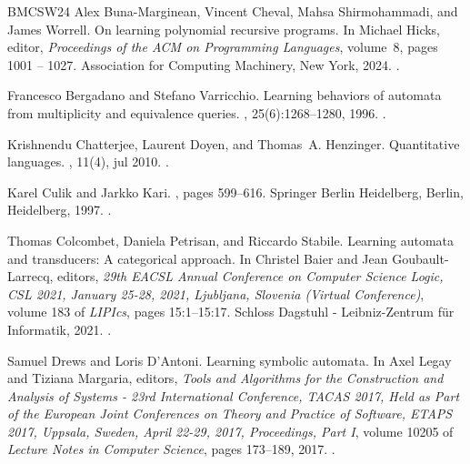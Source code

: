 \documentclass[10pt,a4paper]{amsart}
\theoremstyle{definition}
\numberwithin{equation}{section}
\numberwithin{theorem}{section}
\begin{document}
\begin{thebibliography}{BMCSW24}
Alex Buna-Marginean, Vincent Cheval, Mahsa Shirmohammadi, and James Worrell.
\newblock On learning polynomial recursive programs.
\newblock In Michael Hicks, editor, {\em Proceedings of the ACM on Programming
  Languages}, volume~8, pages 1001 -- 1027. Association for Computing
  Machinery, New York, 2024.
\newblock \href {https://doi.org/10.1145/3632876} {}.

Francesco Bergadano and Stefano Varricchio.
\newblock Learning behaviors of automata from multiplicity and equivalence
  queries.
, 25(6):1268--1280, 1996.
\newblock \href {https://doi.org/10.1137/S009753979326091X}
  {}.

Krishnendu Chatterjee, Laurent Doyen, and Thomas~A. Henzinger.
\newblock Quantitative languages.
, 11(4), jul 2010.
\newblock \href {https://doi.org/10.1145/1805950.1805953}
  {}.

Karel Culik and Jarkko Kari.
, pages 599--616.
\newblock Springer Berlin Heidelberg, Berlin, Heidelberg, 1997.
\newblock \href {https://doi.org/10.1007/978-3-642-59126-6\_10}
  {}.

Thomas Colcombet, Daniela Petrisan, and Riccardo Stabile.
\newblock Learning automata and transducers: {A} categorical approach.
\newblock In Christel Baier and Jean Goubault{-}Larrecq, editors, {\em 29th
  {EACSL} Annual Conference on Computer Science Logic, {CSL} 2021, January
  25-28, 2021, Ljubljana, Slovenia (Virtual Conference)}, volume 183 of {\em
  LIPIcs}, pages 15:1--15:17. Schloss Dagstuhl - Leibniz-Zentrum f{\"{u}}r
  Informatik, 2021.
\newblock \href {https://doi.org/10.4230/LIPIcs.CSL.2021.15}
  {}.

Samuel Drews and Loris D'Antoni.
\newblock Learning symbolic automata.
\newblock In Axel Legay and Tiziana Margaria, editors, {\em Tools and
  Algorithms for the Construction and Analysis of Systems - 23rd International
  Conference, {TACAS} 2017, Held as Part of the European Joint Conferences on
  Theory and Practice of Software, {ETAPS} 2017, Uppsala, Sweden, April 22-29,
  2017, Proceedings, Part {I}}, volume 10205 of {\em Lecture Notes in Computer
  Science}, pages 173--189, 2017.
\newblock \href {https://doi.org/10.1007/978-3-662-54577-5\_10}
  {}.


\end{thebibliography}
\end{document}

